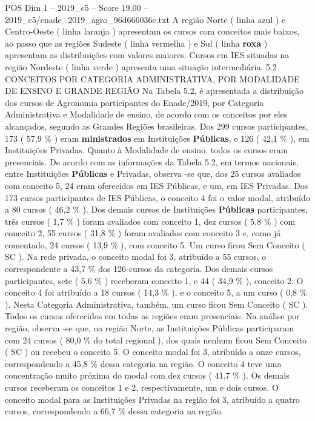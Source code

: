 \begin{textsample}{POS Dim 1 – 2019\_c5 – Score 19.00 – 2019\_c5/enade\_2019\_agro\_96d666036e.txt}
A região Norte ( linha azul ) e Centro-Oeste ( linha laranja ) apresentam os cursos com conceitos mais baixos, ao passo que as regiões Sudeste ( linha vermelha ) e Sul ( linha \textbf{roxa} ) apresentam as distribuições com valores maiores.
Cursos em IES situadas na região Nordeste ( linha verde ) apresenta uma situação intermediária. 5.2 CONCEITOS POR CATEGORIA ADMINISTRATIVA, POR MODALIDADE DE ENSINO E GRANDE REGIÃO Na Tabela 5.2, é apresentada a distribuição dos cursos de Agronomia participantes do Enade/2019, por Categoria Administrativa e Modalidade de ensino, de acordo com os conceitos por eles alcançados, segundo as Grandes Regiões brasileiras.
Dos 299 cursos participantes, 173 ( 57,9 \% ) eram \textbf{ministrados} em Instituições \textbf{Públicas}, e 126 ( 42,1 \% ), em Instituições Privadas.
Quanto à Modalidade de ensino, todos os cursos eram presenciais.
De acordo com as informações da Tabela 5.2, em termos nacionais, entre Instituições \textbf{Públicas} e Privadas, observa -se que, dos 25 cursos avaliados com conceito 5, 24 eram oferecidos em IES Públicas, e um, em IES Privadas.
Dos 173 cursos participantes de IES Públicas, o conceito 4 foi o valor modal, atribuído a 80 cursos ( 46,2 \% ).
Dos demais cursos de Instituições \textbf{Públicas} participantes, três cursos ( 1,7 \% ) foram avaliados com conceito 1, dez cursos ( 5,8 \% ) com conceito 2, 55 cursos ( 31,8 \% ) foram avaliados com conceito 3 e, como já comentado, 24 cursos ( 13,9 \% ), com conceito 5.
Um curso ficou Sem Conceito ( SC ).
Na rede privada, o conceito modal foi 3, atribuído a 55 cursos, o correspondente a 43,7 \% dos 126 cursos da categoria.
Dos demais cursos participantes, sete ( 5,6 \% ) receberam conceito 1, e 44 ( 34,9 \% ), conceito 2.
O conceito 4 foi atribuído a 18 cursos ( 14,3 \% ), e o conceito 5, a um curso ( 0,8 \% ).
Nesta Categoria Administrativa, também, um curso ficou Sem Conceito ( SC ).
Todos os cursos oferecidos em todas as regiões eram presenciais.
Na análise por região, observa -se que, na região Norte, as Instituições Públicas participaram com 24 cursos ( 80,0 \% do total regional ), dos quais nenhum ficou Sem Conceito ( SC ) ou recebeu o conceito 5.
O conceito modal foi 3, atribuído a onze cursos, correspondendo a 45,8 \% dessa categoria na região.
O conceito 4 teve uma concentração muito próxima do modal com dez cursos ( 41,7 \% ).
Os demais cursos receberam os conceitos 1 e 2, respectivamente, um e dois cursos.
O conceito modal para as Instituições Privadas na região foi 3, atribuído a quatro cursos, correspondendo a 66,7 \% dessa categoria na região.

\end{textsample}
